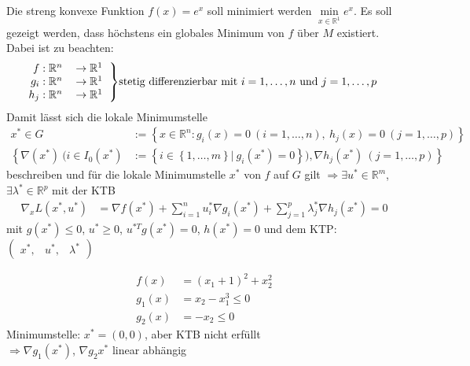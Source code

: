 \begin{exmp}
Die streng konvexe Funktion $f(x)=e^x$ soll minimiert werden $\min\limits_{x\in\mathbb{R}^1}e^x$. Es soll gezeigt werden, dass höchstens ein globales Minimum von $f$ über $M$ existiert.
Dabei ist zu beachten:
\begin{align*}
\left.
 \begin{tabular}{rl}
 $f:\mathbb{R}^n$ & $\rightarrow \mathbb{R}^1$\\
 $g_i:\mathbb{R}^n$ & $\rightarrow \mathbb{R}^1$\\
 $h_j:\mathbb{R}^n$ & $\rightarrow \mathbb{R}^1$
 \end{tabular}\right\} & \text{stetig differenzierbar mit }i=1,\ldots,n\text{ und } j=1,\ldots,p
\end{align*}
Damit lässt sich die lokale Minimumstelle
\begin{align*}
x^{\ast}\in G & := \left\{ x\in\mathbb{R}^n:g_i(x)=0\ (i=1,\ldots,n),\ h_j(x)=0\ (j=1,\ldots,p) \right\}\\
\left\{ \nabla(x^{\ast})\ (i\in I_0(x^{\ast}) \right. & \left. := \left\{ i\in\left\{1,\ldots,m\right\}|\ g_i(x^{\ast})=0 \right\}),\nabla h_j(x^{\ast})\ (j=1,\ldots,p) \right\} 
\end{align*}
beschreiben und für die lokale Minimumstelle $x^{\ast}$ von $f$ auf $G$  gilt $\Rightarrow\exists u^{\ast}\in\mathbb{R}^m$, $\exists\lambda^{\ast}\in\mathbb{R}^p$ mit der \ac{KTB}
\begin{align*}
	\nabla_x L(x^{\ast},u^{\ast}) & = \nabla f(x^{\ast})+\sum\limits_{i=1}^n u_i^{\ast}\nabla g_i(x^{\ast})+\sum\limits_{j=1}^p\lambda_j^{\ast}\nabla h_j(x^{\ast})=0
\end{align*}
mit $g(x^{\ast})\le 0$, $u^{\ast}\ge 0$, $u^{\ast T}g(x^{\ast})=0$, $h(x^{\ast})=0$ und dem \ac{KTP}: $\begin{pmatrix}x^{\ast}, & u^{\ast}, & \lambda^{\ast} \end{pmatrix}$
\end{exmp}
 
\begin{gegenexmp}\hspace{1cm}
\begin{minipage}{0.5\textwidth}
\begin{align*}
f(x) & = (x_1+1)^2+x^2_2\\
g_1(x) & = x_2-x^3_1 \le 0\\
g_2(x) & = -x_2 \le 0
\end{align*}
Minimumstelle: $x^{\ast}=(0,0)$, aber \ac{KTB} nicht erfüllt\\
$\Rightarrow \nabla g_1(x^{\ast})$, $\nabla g_2{x^{\ast}}$ linear abhängig

\end{minipage}
\begin{minipage}{0.5\textwidth}
	\centering
	
\end{minipage}
\end{gegenexmp}

